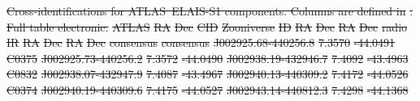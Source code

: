 \documentclass[11pt, a4paper]{book}
\providecommand{\DIFdeltex}[1]{{\protect\color{red}\sout{#1}}}                      %
\providecommand{\DIFdel}[1]{\texorpdfstring{\DIFdeltex{#1}}{}} %
\begin{document}
{%
\DIFdel{Cross-identifications for ATLAS~ELAIS-S1 components. Columns are defined in }%
\DIFdel{. Full table electronic.}}
\DIFdel{ATLAS }%
\DIFdel{RA }%
\DIFdel{Dec }%
\DIFdel{CID }%
\DIFdel{Zooniverse }%
\DIFdel{ID }%
\DIFdel{RA }%
\DIFdel{Dec }%
\DIFdel{RA }%
\DIFdel{Dec }%
\DIFdel{radio }%
\DIFdel{IR }%
\DIFdel{RA }%
\DIFdel{Dec }%
\DIFdel{RA }%
\DIFdel{Dec }%
\DIFdel{consensus }%
\DIFdel{consensus}%
\DIFdel{J002925.68-440256.8 }%
\DIFdel{7.3570 }%
\DIFdel{-44.0491 }%
\DIFdel{C0375 }%
\DIFdel{J002925.73-440256.2 }%
\DIFdel{7.3572 }%
\DIFdel{-44.0490 }%
\DIFdel{J002938.19-432946.7 }%
\DIFdel{7.4092 }%
\DIFdel{-43.4963 }%
\DIFdel{C0832 }%
\DIFdel{J002938.07-432947.9 }%
\DIFdel{7.4087 }%
\DIFdel{-43.4967 }%
\DIFdel{J002940.13-440309.2 }%
\DIFdel{7.4172 }%
\DIFdel{-44.0526 }%
\DIFdel{C0374 }%
\DIFdel{J002940.19-440309.6 }%
\DIFdel{7.4175 }%
\DIFdel{-44.0527 }%
\DIFdel{J002943.14-440812.3 }%
\DIFdel{7.4298 }%
\DIFdel{-44.1368 }%
\end{document}
